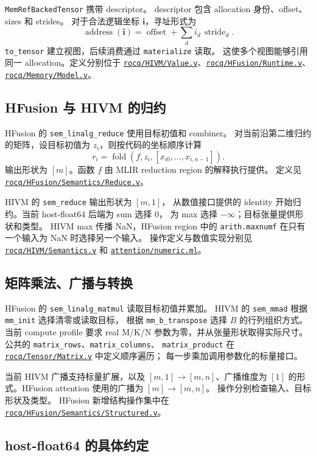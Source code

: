 \documentclass[UTF8,a4paper,11pt,fontset=fandol]{ctexart}
\newcommand{\code}{\nolinkurl}
\newcommand{\src}[1]{\href{run:../#1}{\nolinkurl{#1}}}
\begin{document}
{\code{MemRefBackedTensor} 携带 descriptor。
descriptor 包含 allocation 身份、offset、sizes 和 strides。
对于合法逻辑坐标 $\boldsymbol{i}$，寻址形式为
\[
  \operatorname{address}(\boldsymbol{i})
  =\operatorname{offset}+\sum_d i_d\,\operatorname{stride}_d.
\]
\code{to_tensor} 建立视图，后续消费通过 \code{materialize} 读取。
这使多个视图能够引用同一 allocation。定义分别位于
\src{rocq/HIVM/Value.v}、\src{rocq/HFusion/Runtime.v}、
\src{rocq/Memory/Model.v}。

\subsection{HFusion 与 HIVM 的归约}

HFusion 的 \code{sem_linalg_reduce} 使用目标初值和 combiner。
对当前沿第二维归约的矩阵，设目标初值为 $z_i$，则按代码的坐标顺序计算
\[
  r_i=\operatorname{fold}(f,z_i,[x_{i0},\ldots,x_{i,n-1}]).
\]
输出形状为 $[m]$。函数 $f$ 由 MLIR reduction region 的解释执行提供。
定义见 \src{rocq/HFusion/Semantics/Reduce.v}。

HIVM 的 \code{sem_reduce} 输出形状为 $[m,1]$，
从数值接口提供的 identity 开始归约。当前 host-float64 后端为 sum 选择 $0$，
为 max 选择 $-\infty$；目标张量提供形状和类型。
HIVM max 传播 NaN，HFusion region 中的 \code{arith.maxnumf}
在只有一个输入为 NaN 时选择另一个输入。
操作定义与数值实现分别见 \src{rocq/HIVM/Semantics.v}
和 \src{attention/numeric.ml}。

\subsection{矩阵乘法、广播与转换}

HFusion 的 \code{sem_linalg_matmul} 读取目标初值并累加。
HIVM 的 \code{sem_mmad} 根据 \code{mm_init} 选择清零或读取目标，
根据 \code{mm_b_transpose} 选择 $B$ 的行列组织方式。
当前 compute profile 要求 real M/K/N 参数为零，并从张量形状取得实际尺寸。
公共的 \code{matrix_rows}、\code{matrix_columns}、
\code{matrix_product} 在 \src{rocq/Tensor/Matrix.v} 中定义顺序遍历；
每一步乘加调用参数化的标量接口。

当前 HIVM 广播支持标量扩展，以及 $[m,1]\to[m,n]$、广播维度为
$[1]$ 的形式。HFusion attention 使用的广播为 $[m]\to[m,n]$。
操作分别检查输入、目标形状及类型。
HFusion 新增结构操作集中在
\src{rocq/HFusion/Semantics/Structured.v}。

\subsection{host-float64 的具体约定}

}
\end{document}
